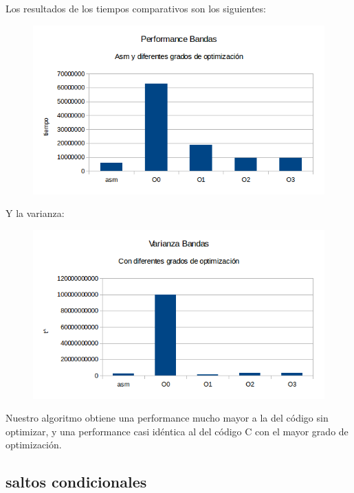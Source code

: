 \documentclass[a4paper]{article}
\begin{document}
Los resultados de los tiempos comparativos son los siguientes:

\begin{figure}[h!]
  \begin{center}
  \includegraphics[scale=0.66]{Graficos1.4/ban/per.png}
  \label{nombreparareferenciar9}
  \end{center}
\end{figure}

\newpage
Y la varianza:

\begin{figure}[h!]
  \begin{center}
  \includegraphics[scale=0.66]{Graficos1.4/ban/var.png}
  \label{nombreparareferenciar10}
  \end{center}
\end{figure}

Nuestro algoritmo obtiene una performance mucho mayor a la del código sin optimizar, y una performance casi idéntica al del código C con el mayor grado de optimización.

\newpage
\subsection{saltos condicionales}
\end{document}
